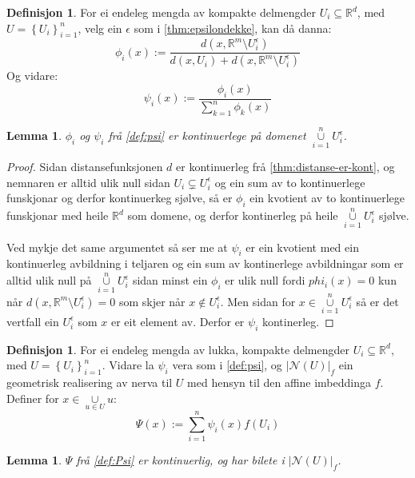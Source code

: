 \documentclass[a4paper, 12pt, norsk]{article}
\theoremstyle{plain}
\newtheorem{lemma}[theorem]{Lemma}
\theoremstyle{definition}
\newtheorem{definition}[theorem]{Definisjon}
\newcommand{\Rb}{\mathbb{R}}
\newcommand{\Nc}{\mathcal{N}}
\newcommand{\union}{ \mathop{\cup}\limits }
\newcommand{\gr}[1]{ \lvert #1 \rvert } %
\newcommand{\set}[1]{ \left \{ #1 \right \} } %
\begin{document}
\begin{definition} \label{def:psi} %
	For ei endeleg mengda av kompakte delmengder \( U_i \subseteq \Rb^d \), med \( U = \set{U_i}_{i=1}^n \), velg ein \( \epsilon \) som i \autoref{thm:epsilondekke}, kan då danna:
	\[
		\phi_i(x) := \frac{d(x, \Rb^m \setminus U_i^\epsilon)}{d(x, U_i) + d(x, \Rb^m \setminus U_i^\epsilon)}
	\]
	Og vidare:
	\[
		\psi_i(x) := \frac{\phi_i(x)}{\sum_{k=1}^n \phi_k(x)}
	\]
\end{definition}

\begin{lemma}
	\( \phi_i \) og \( \psi_i \) frå \autoref{def:psi} er kontinuerlege på domenet \( \union_{i=1}^n U_i^\epsilon \).
\end{lemma}

\begin{proof} 
	Sidan distansefunksjonen \( d \) er kontinuerleg frå \autoref{thm:distanse-er-kont}, og nemnaren er alltid ulik null sidan \( U_i \subsetneq U_i^\epsilon \) og ein sum av to kontinuerlege funskjonar og derfor kontinuerkeg sjølve, så er \( \phi_i \) ein kvotient av to kontinuerlege funskjonar med heile \( \Rb^d \) som domene, og derfor kontinerleg på heile \( \union_{i=1}^n U_i^\epsilon \) sjølve.

	Ved mykje det same argumentet så ser me at \( \psi_i \) er ein kvotient med ein kontinuerleg avbildning i teljaren og ein sum av kontinerlege avbildningar som er alltid ulik null på \( \union_{i=1}^n U_i^\epsilon \) sidan minst ein \( \phi_i \) er ulik null fordi \( phi_i(x)=0 \) kun når \( d(x, \Rb^m \setminus U_i^\epsilon)=0 \) som skjer når \( x \not\in U_i^\epsilon \). Men sidan for \( x \in \union_{i=1}^n U_i^\epsilon \) så er det vertfall ein \( U_i^\epsilon \) som \( x \) er eit element av. Derfor er \( \psi_i \) kontinerleg.
\end{proof}

\begin{definition} \label{def:Psi}
	For ei endeleg mengda av lukka, kompakte delmengder \( U_i \subseteq \Rb^d \), med \( U = \set{U_i}_{i=1}^n \). Vidare la \( \psi_i \) vera som i \autoref{def:psi}, og \( \gr{\Nc(U)}_f \) ein geometrisk realisering av nerva til \( U \) med hensyn til den affine imbeddinga \( f \). Definer for \( x \in \union_{u \in U} u \):
	\[
		\Psi(x) := \sum_{i=1}^n \psi_i(x)f(U_i)
	\]
\end{definition}

\begin{lemma} \label{thm:psi-kont} %
	\( \Psi \) frå \autoref{def:Psi} er kontinuerlig, og har bilete i \( \gr{\Nc(U)}_f \).
\end{lemma}
\end{document}
